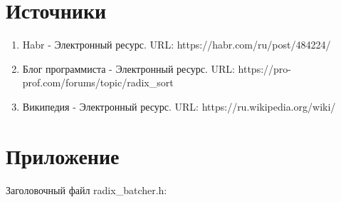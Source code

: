 \documentclass{report}
\begin{document}
\section*{Источники}
\begin{enumerate}
\item Habr - Электронный ресурс. URL: https://habr.com/ru/post/484224/
\item Блог программиста - Электронный ресурс. URL: https://pro-prof.com/forums/topic/radix\_sort
\item Википедия - Электронный ресурс. URL: https://ru.wikipedia.org/wiki/%
\end{enumerate} 
\newpage
\section*{Приложение}
Заголовочный файл radix\_batcher.h:\\
\end{document}
